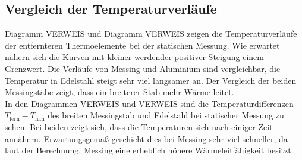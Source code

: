 \subsection{Vergleich der Temperaturverläufe}
Diagramm VERWEIS und Diagramm VERWEIS zeigen die Temperaturverläufe der entfernteren Thermoelemente bei der statischen Messung. Wie erwartet nähern sich die Kurven mit kleiner werdender positiver Steigung einem Grenzwert. Die Verläufe von Messing und Aluminium sind vergleichbar, die Temperatur in Edelstahl steigt sehr viel langsamer an. Der Vergleich der beiden Messingstäbe zeigt, dass ein breiterer Stab mehr Wärme leitet. \\
In den Diagrammen VERWEIS und VERWEIS sind die Temperaturdifferenzen $T_\text{fern}-T_\text{nah}$ des breiten Messingstab und Edelstahl bei statischer Messung zu sehen. Bei beiden zeigt sich, dass die Temperaturen sich nach einiger Zeit annähern. Erwartungsgemäß geschieht dies bei Messing sehr viel schneller, da laut der Berechnung, Messing eine erheblich höhere Wärmeleitfähigkeit besitzt.